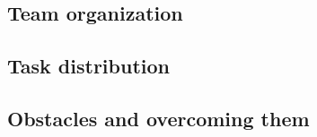 \subsection{Team organization}
\subsection{Task distribution}
\subsection{Obstacles and overcoming them}
